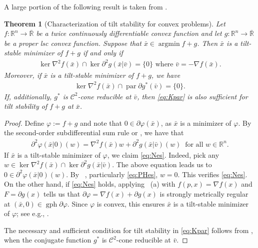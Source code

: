 \documentclass[reqno]{amsart}
\newtheorem{theorem}[proposition]{Theorem}
\numberwithin{equation}{section}
\newcommand{\R}{\mathbb{R}}
\newcommand{\x}{\bar{x}}
\newcommand{\argmin}{\operatorname{argmin}}
\newcommand{\gph}{\operatorname{gph}}
\begin{document}
\noindent
A large portion of the following result is taken from \cite{CHNS 26}.

\begin{theorem}[Characterization of tilt stability for convex problems]\label{thm:tiltstab2}
    Let $f : \R^n \to \overline{\R}$ be a twice continuously differentiable
    convex function and let $g : \R^n \to \overline{\R}$ be a proper lsc convex function.
    Suppose that $\bar{x}\in \argmin f+g$. Then  $\bar{x}$ is a tilt-stable minimizer of $f + g$
    if and only if 
    \begin{align}\label{eq:Nes}
        \ker \nabla^2 f(\bar{x}) \cap \ker \partial^2 g(\bar{x} | \bar{v}) = \{0\} \text{ where } \bar{v} = -\nabla f(\bar{x}).
    \end{align} Moreover, if $\bar{x}$ is a tilt-stable minimizer of $f + g$, we have 
    \begin{align}\label{eq:Kpar}
        \ker \nabla^2 f(\bar{x}) \cap \operatorname{par} \partial g^*(\bar{v}) = \{0\}.
    \end{align}
    If, additionally, $g^*$ is $\mathcal{C}^2$-cone reducible at $\bar{v}$, then \eqref{eq:Kpar} is also sufficient for tilt stability of $f + g$ at $\bar{x}$.
\end{theorem}

\begin{proof}
    Define $\varphi := f + g$ and note that $0\in\partial \varphi(\x)$, as $\x$ is a minimizer of $\varphi$. By the second-order subdifferential sum rule  or ,  we have that 
    \begin{align*}
        \partial^2 \varphi(\bar{x} | 0)(w) = \nabla^2 f(\bar{x})w + \partial^2 g(\bar{x} | \bar v)(w) \ \text{ for all } w \in \R^n.
    \end{align*} 
    If  $\x$ is a tilt-stable minimizer of $\varphi$, we claim \eqref{eq:Nes}. Indeed, pick any $w \in \ker \nabla^2 f(\bar{x}) \cap \ker \partial^2 g(\bar{x} | \bar{v})$. The above equation leads us to
     $0\in \partial^2 \varphi (\bar{x} | 0)(w)$.
    By ~, particularly \eqref{eq:PHes}, $w = 0$. This verifies \eqref{eq:Nes}. On the other hand, if \eqref{eq:Nes}  holds, applying ~(a) with $f(p,x)=\nabla f(x)$ and $F=\partial g(x)$ tells us that $\partial \varphi=\nabla f(x)+\partial g(x)$ is strongly metrically regular at $(\x,0)\in \gph \partial \varphi$. Since $\varphi$ is convex, this ensures $\x$ is a tilt-stable minimizer of $\varphi$; see e.g.,  \cite{AG08}.
    
    The necessary and sufficient condition for tilt stability in \eqref{eq:Kpar} follows from \cite[Theorem 4.3 and Theorem 4.5]{CHNS 26}, when the conjugate function $g^*$ is $\mathcal{C}^2$-cone reducible at $\bar v$.
\end{proof}
\end{document}
